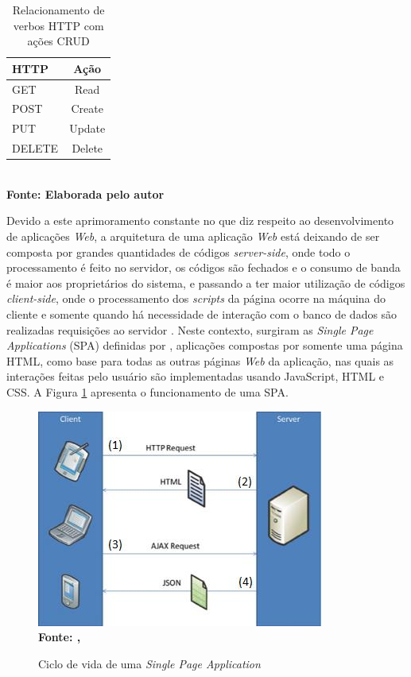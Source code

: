 \begin{table}[htb]
	\centering
	\caption{\hspace{0.1cm} Relacionamento de verbos HTTP com ações CRUD}
	\vspace{-0.3cm} %
	\label{tab:tabela1}
	\begin{tabular}{l|c}
  \hline
    \textbf{HTTP} & \textbf{Ação} \\
    \hline
      GET & Read \\
      POST & Create \\
      PUT & Update \\
      DELETE & Delete \\
     \hline
 \end{tabular}
 	\vspace{.1cm}  %
	\small
	{\footnotesize\\ \textbf{Fonte: Elaborada pelo autor}}
\end{table}

Devido a este aprimoramento constante no que diz respeito ao desenvolvimento de aplicações \textit{Web}, a arquitetura de uma aplicação 
\textit{Web} está deixando 
de ser composta por grandes quantidades de códigos \textit{server-side}, onde todo o processamento é feito no servidor, os códigos são fechados e 
o consumo de banda é maior aos proprietários do sistema, e passando a ter maior utilização de códigos \textit{client-side}, onde o processamento dos 
\textit{scripts} da página ocorre na máquina do cliente e somente quando há necessidade de interação com o banco de dados são 
realizadas requisições ao 
servidor \cite{spa01}. Neste contexto, surgiram as \textit{Single Page Applications} (SPA) definidas por 
, aplicações compostas por somente 
uma página HTML, como base para todas as outras páginas \textit{Web} da aplicação, nas quais 
as interações feitas pelo usuário são implementadas usando 
JavaScript, HTML e CSS. A Figura \ref{fig:spa} apresenta o funcionamento de uma SPA.

\begin{figure}[!ht]
	\centering	
	\caption[\hspace{0.1cm} Ciclo de vida de uma \textit{Single Page Application}.]{Ciclo de vida de uma \textit{Single Page Application}}
	  \vspace{-0.4cm}
	\includegraphics[width=.6\textwidth]{figuras/spa.png}
	 \vspace{-0.3cm}
	\\\textbf{\footnotesize Fonte: \citeauthor{spa02}, \citeyear{spa02}}
	\label{fig:spa}
\end{figure}

